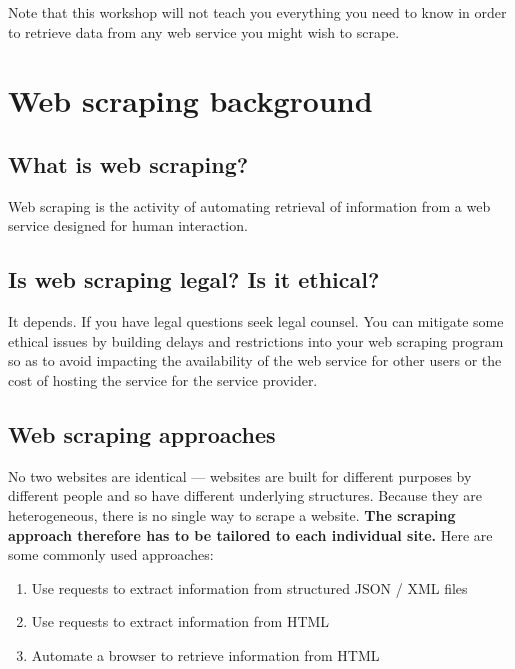 \documentclass[]{book}
\providecommand{\tightlist}{%
  \setlength{\itemsep}{0pt}\setlength{\parskip}{0pt}}
\begin{document}
Note that this workshop will not teach you everything you need to know in order to retrieve data from any web service you might wish to scrape.

\hypertarget{web-scraping-background}{%
\section{Web scraping background}\label{web-scraping-background}}

\hypertarget{what-is-web-scraping}{%
\subsection{What is web scraping?}\label{what-is-web-scraping}}

Web scraping is the activity of automating retrieval of information from a web service designed for human interaction.

\hypertarget{is-web-scraping-legal-is-it-ethical}{%
\subsection{Is web scraping legal? Is it ethical?}\label{is-web-scraping-legal-is-it-ethical}}

It depends. If you have legal questions seek legal counsel. You can mitigate some ethical issues by building delays and restrictions into your web scraping program so as to avoid impacting the availability of the web service for other users or the cost of hosting the service for the service provider.

\hypertarget{web-scraping-approaches}{%
\subsection{Web scraping approaches}\label{web-scraping-approaches}}

No two websites are identical --- websites are built for different purposes by different people and so have different underlying structures. Because they are heterogeneous, there is no single way to scrape a website. \textbf{The scraping approach therefore has to be tailored to each individual site.} Here are some commonly used approaches:

\begin{enumerate}
\def\labelenumi{\arabic{enumi}.}
\tightlist
\item
  Use requests to extract information from structured JSON / XML files
\item
  Use requests to extract information from HTML
\item
  Automate a browser to retrieve information from HTML
\end{enumerate}
\end{document}
